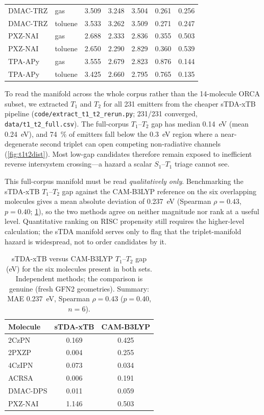 \documentclass[twoside,twocolumn,9pt]{extarticle}
\begin{document}
\begin{table}[htbp]
\begin{tabular}{llccccc}
    DMAC-TRZ & gas & 3.509 & 3.248 & 3.504 & 0.261 & 0.256 \\
    DMAC-TRZ & toluene & 3.533 & 3.262 & 3.509 & 0.271 & 0.247 \\
    PXZ-NAI & gas & 2.688 & 2.333 & 2.836 & 0.355 & 0.503 \\
    PXZ-NAI & toluene & 2.650 & 2.290 & 2.829 & 0.360 & 0.539 \\
    TPA-APy & gas & 3.555 & 2.679 & 2.823 & 0.876 & 0.144 \\
    TPA-APy & toluene & 3.425 & 2.660 & 2.795 & 0.765 & 0.135 \\
    \bottomrule
  \end{tabular}
\end{table}

To read the manifold across the whole corpus rather than the \num{14}-molecule ORCA
subset, we extracted $T_1$ and $T_2$ for all \num{231} emitters from the cheaper
sTDA-xTB pipeline (\texttt{code/extract\_t1\_t2\_rerun.py}; \num{231}/\num{231}
converged, \texttt{data/t1\_t2\_full.csv}). The full-corpus $T_1$--$T_2$ gap has median
\qty{0.14}{\electronvolt} (mean \qty{0.24}{\electronvolt}), and \qty{74}{\percent} of
emitters fall below the \qty{0.3}{\electronvolt} region where a near-degenerate second
triplet can open competing non-radiative channels (\cref{fig:t1t2dist}). Most
low-gap candidates therefore remain exposed to inefficient reverse intersystem
crossing---a hazard a scalar $S_1$--$T_1$ triage cannot see.

This full-corpus manifold must be read \emph{qualitatively only}. Benchmarking the
sTDA-xTB $T_1$--$T_2$ gap against the CAM-B3LYP reference on the six overlapping
molecules gives a mean absolute deviation of \qty{0.237}{\electronvolt}
(Spearman $\rho = 0.43$, $p = 0.40$; \cref{tab:manifold_val}), so the two methods agree
on neither magnitude nor rank at a useful level. Quantitative ranking on RISC propensity
still requires the higher-level calculation; the sTDA manifold serves only to flag that
the triplet-manifold hazard is widespread, not to order candidates by it.

\begin{table}[htbp]
  \centering
  \caption{sTDA-xTB versus CAM-B3LYP $T_1$--$T_2$ gap (eV) for the six molecules present
    in both sets. Independent methods; the comparison is genuine (fresh GFN2 geometries).
    Summary: MAE \qty{0.237}{\electronvolt}, Spearman $\rho = 0.43$ ($p = 0.40$, $n = 6$).}
  \label{tab:manifold_val}
  \small
  \begin{tabular}{lcc}
    \toprule
    Molecule & sTDA-xTB & CAM-B3LYP \\
    \midrule
    2CzPN    & 0.169 & 0.425 \\
    2PXZP    & 0.004 & 0.255 \\
    4CzIPN   & 0.073 & 0.034 \\
    ACRSA    & 0.006 & 0.191 \\
    DMAC-DPS & 0.011 & 0.059 \\
    PXZ-NAI  & 1.146 & 0.503 \\
    \bottomrule
  \end{tabular}
\end{table}
\end{document}
